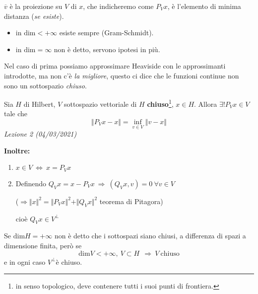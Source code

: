 \documentclass[10pt,a4paper,twoside,openright]{book}
\begin{document}
\FloatBarrier

$\displaystyle \overline{v}$ è la proiezione su $V$ di $x$, che indicheremo come $P_{V} x$, è l'elemento di minima distanza (\textit{se esiste}).
\begin{itemize}
\item in $\mathrm{dim} < +\infty $ esiste sempre (Gram-Schmidt).
\item in $\mathrm{dim} =\infty $ non è detto, servono ipotesi in più.
\end{itemize}

Nel caso di prima possiamo approssimare Heaviside con le approssimanti introdotte, ma non c'è \textit{la migliore}, questo ci dice che le funzioni continue non sono un sottospazio \textit{chiuso}.
\begin{theorem}
 Sia $H$ di Hilbert, $V$ sottospazio vettoriale di $H$ \textbf{chiuso}\footnote{in senso topologico, deve contenere tutti i suoi punti di frontiera.}, $x\in H$. Allora $\exists !P_{V} x\in V$ tale che
\begin{equation*}
\Vert P_{V} x-x\Vert =\inf_{v\in V}\Vert v-x\Vert 
\end{equation*}
\textit{Lezione 2 (04/03/2021)}

\textbf{Inoltre:}
\begin{enumerate}
\item $\displaystyle x\in V\ \Leftrightarrow \ x=P_{V} x$
\item Definendo $\displaystyle Q_{V} x=x-P_{V} x\ \Rightarrow \ (Q_{V} x,v) =0\ \forall v\in V$

($\displaystyle \Longrightarrow \Vert x\Vert ^{2} =\Vert P_{V} x\Vert ^{2} +\Vert Q_{V} x\Vert ^{2}$ teorema di Pitagora)

cioè $\displaystyle Q_{V} x\in V^{\bot }$
\end{enumerate}
\end{theorem}
\begin{nb}
Se $\displaystyle \mathrm{dim} H\mathrm{=+\infty }$ non è detto che i sottospazi siano chiusi, a differenza di spazi a dimensione finita, però se
\begin{equation*}
\mathrm{dim} V< +\infty,\ V\subset H\ \ \Rightarrow \ V\ \text{chiuso}
\end{equation*}
e in ogni caso $\displaystyle V^{\bot }$è chiuso.
\end{nb}
\end{document}
